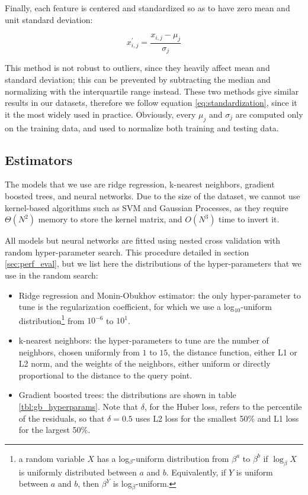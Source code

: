 \documentclass[a4paper]{book}
\begin{document}
Finally, each feature is centered and standardized so as to have zero mean and unit standard deviation:

\begin{equation}
\label{eq:standardization}
x^\prime_{i,j}=\frac{x_{i,j}-\mu_j}{\sigma_j}
\end{equation}

This method is not robust to outliers, since they heavily affect mean and standard deviation; this can be prevented by subtracting the median and normalizing with the interquartile range instead. These two methods give similar results in our datasets, therefore we follow equation \ref{eq:standardization}, since it it the most widely used in practice. Obviously, every $\mu_j$ and $\sigma_j$ are computed only on the training data, and used to normalize both training and testing data.

\subsection{Estimators}

The models that we use are ridge regression, k-nearest neighbors, gradient boosted trees, and neural networks. Due to the size of the dataset, we cannot use kernel-based algorithms such as SVM and Gaussian Processes, as they require $\Theta(N^2)$ memory to store the kernel matrix, and $O(N^3)$ time to invert it.

All models but neural networks are fitted using nested cross validation with random hyper-parameter search. This procedure detailed in section \ref{sec:perf_eval}, but we list here the distributions of the hyper-parameters that we use in the random search:

\begin{itemize}
\item Ridge regression and Monin-Obukhov estimator: the only hyper-parameter to tune is the regularization coefficient, for which we use a log$_{10}$-uniform distribution\footnote{a random variable $X$ has a log$_\beta$-uniform distribution from $\beta^a$ to $\beta^b$ if $\log_\beta X$ is uniformly distributed between $a$ and $b$. Equivalently, if $Y$ is uniform between $a$ and $b$, then $\beta^Y$ is log$_\beta$-uniform.} from $10^{-6}$ to $10^{1}$.

\item k-nearest neighbors: the hyper-parameters to tune are the number of neighbors, chosen uniformly from $1$ to $15$, the distance function, either L1 or L2 norm, and the weights of the neighbors, either uniform or directly proportional to the distance to the query point.

\item Gradient boosted trees: the distributions are shown in table \ref{tbl:gb_hyperparams}. Note that $\delta$, for the Huber loss, refers to the percentile of the residuals, so that $\delta=0.5$ uses L2 loss for the smallest 50\% and L1 loss for the largest 50\%.
\end{itemize}
\end{document}
